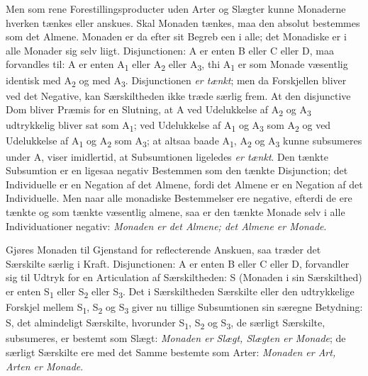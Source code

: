 \documentclass[12pt]{book}
\newcommand{\opage}[1]{\marginnote{\footnotesize\textit{[#1]}}}
\begin{document}
Men som rene Forestillingsproducter uden Arter og Slægter kunne Monaderne hverken tænkes eller anskues. Skal
\opage{362}Monaden tænkes, maa den absolut bestemmes som det Almene. Monaden er da efter sit Begreb een i alle; det Monadiske er i alle Monader sig selv liigt. Disjunctionen: A er enten B eller C eller D, maa forvandles til: A er enten A\textsubscript{1} eller A\textsubscript{2} eller A\textsubscript{3}, thi A\textsubscript{1} er som Monade væsentlig identisk med A\textsubscript{2} og med A\textsubscript{3}. Disjunctionen \emph{er tænkt}; men da Forskjellen bliver ved det Negative, kan Særskiltheden ikke træde særlig frem. At den disjunctive Dom bliver Præmis for en Slutning, at A ved Udelukkelse af A\textsubscript{2} og A\textsubscript{3} udtrykkelig bliver sat som A\textsubscript{1}; ved Udelukkelse af A\textsubscript{1} og A\textsubscript{3} som A\textsubscript{2} og ved Udelukkelse af A\textsubscript{1} og A\textsubscript{2} som A\textsubscript{3}; at altsaa baade A\textsubscript{1}, A\textsubscript{2} og A\textsubscript{3} kunne subsumeres under A, viser imidlertid, at Subsumtionen ligeledes \emph{er tænkt}. Den tænkte Subsumtion er en ligesaa negativ Bestemmen som den tænkte Disjunction; det Individuelle er en Negation af det Almene, fordi det Almene er en Negation af det Individuelle. Men naar alle monadiske Bestemmelser ere negative, efterdi de ere tænkte og som tænkte væsentlig almene, saa er den tænkte Monade selv i alle Individuationer negativ: \emph{Monaden er det Almene; det Almene er Monade}.

Gjøres Monaden til Gjenstand for reflecterende Anskuen, saa træder det Særskilte særlig i Kraft. Disjunctionen: A er enten B eller C eller D, forvandler sig til Udtryk for en Articulation af Særskiltheden: S (Monaden i sin Særskilthed) er enten S\textsubscript{1} eller S\textsubscript{2} eller S\textsubscript{3}. Det i Særskiltheden Særskilte eller den udtrykkelige Forskjel mellem S\textsubscript{1}, S\textsubscript{2} og S\textsubscript{3} giver nu tillige Subsumtionen sin særegne Betydning: S, det almindeligt Særskilte, hvorunder S\textsubscript{1}, S\textsubscript{2} og S\textsubscript{3}, de særligt Særskilte, subsumeres, er bestemt som Slægt: \emph{Monaden er Slægt, Slægten er Monade}; de særligt Særskilte ere med det Samme bestemte som Arter: \emph{Monaden er Art, Arten er Monade}.
\end{document}
